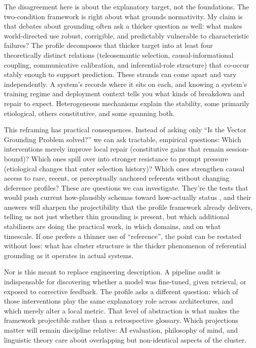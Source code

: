 \documentclass[12pt]{article}
\begin{document}
The disagreement here is about the explanatory target, not the foundations. The two-condition framework is right about what grounds normativity. My claim is that debates about grounding often ask a thicker question as well: what makes world-directed use robust, corrigible, and predictably vulnerable to characteristic failures? The profile decomposes that thicker target into at least four theoretically distinct relations (teleosemantic selection, causal-informational coupling, communicative calibration, and inferential-role structure) that co-occur stably enough to support prediction. These strands can come apart and vary independently. A system's  records where it sits on each, and knowing a system's training regime and deployment context tells you what kinds of breakdown and repair to expect. Heterogeneous mechanisms explain the stability, some primarily etiological, others constitutive, and some spanning both.

This reframing has practical consequences. Instead of asking only \enquote{Is the Vector Grounding Problem solved?} we can ask tractable, empirical questions: Which interventions merely improve local repair (constitutive gains that remain session-bound)? Which ones spill over into stronger resistance to prompt pressure (etiological changes that enter selection history)? Which ones strengthen causal access to rare, recent, or perceptually anchored referents without changing deference profiles? These are questions we can investigate. They're the tests that would push current how-plausibly schemas toward how-actually status \citep[95]{craver_darden_2013_in_search_of_mechanisms}, and their answers will sharpen the projectibility that the profile framework already delivers, telling us not just whether thin grounding is present, but which additional stabilizers are doing the practical work, in which domains, and on what timescale. If one prefers a thinner use of \enquote{reference}, the point can be restated without loss: what has cluster structure is the thicker phenomenon of referential grounding as it operates in actual systems.

Nor is this meant to replace engineering description. A pipeline audit is indispensable for discovering whether a model was fine-tuned, given retrieval, or exposed to corrective feedback. The profile asks a different question: which of those interventions play the same explanatory role across architectures, and which merely alter a local metric. That level of abstraction is what makes the framework projectible rather than a retrospective glossary. Which projections matter will remain discipline relative: AI evaluation, philosophy of mind, and linguistic theory care about overlapping but non-identical aspects of the cluster.
\end{document}
